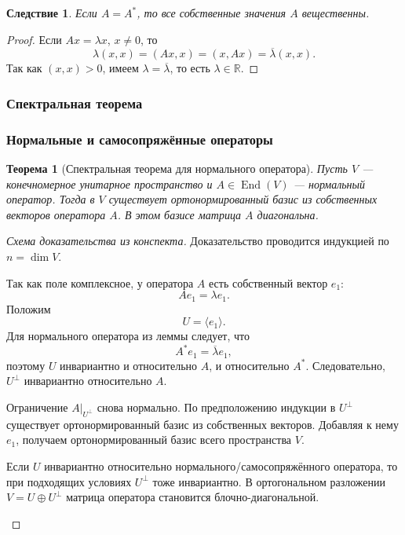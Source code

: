 \documentclass[12pt,a4paper]{article}
\theoremstyle{definition}
\theoremstyle{plain}
\newtheorem{theorem}[definition]{Теорема}
\newtheorem{corollary}[definition]{Следствие}
\theoremstyle{remark}
\newenvironment{knowledgefix}{\begin{clarifybox}}{\end{clarifybox}}
\newcommand{\R}{\mathbb{R}}
\newcommand{\End}{\operatorname{End}}
\begin{document}
\begin{corollary}
Если $A=A^*$, то все собственные значения $A$ вещественны.
\end{corollary}

\begin{proof}
Если $Ax=\lambda x$, $x\ne0$, то
\[
    \lambda(x,x)=(Ax,x)=(x,Ax)=\overline{\lambda}(x,x).
\]
Так как $(x,x)>0$, имеем $\lambda=\overline\lambda$, то есть $\lambda\in\R$.
\end{proof}

\subsubsection{Спектральная теорема}

\subsubsection*{Нормальные и самосопряжённые операторы}

\begin{theorem}[Спектральная теорема для нормального оператора]
Пусть $V$ --- конечномерное унитарное пространство и $A\in\End(V)$ --- нормальный оператор.
Тогда в $V$ существует ортонормированный базис из собственных векторов оператора $A$.
В этом базисе матрица $A$ диагональна.
\end{theorem}

\begin{proof}[Схема доказательства из конспекта]
Доказательство проводится индукцией по $n=\dim V$.

Так как поле комплексное, у оператора $A$ есть собственный вектор $e_1$:
\[
    Ae_1=\lambda e_1.
\]
Положим
\[
    U=\langle e_1\rangle.
\]
Для нормального оператора из леммы следует, что
\[
    A^*e_1=\overline\lambda e_1,
\]
поэтому $U$ инвариантно и относительно $A$, и относительно $A^*$.
Следовательно, $U^\perp$ инвариантно относительно $A$.

Ограничение $A|_{U^\perp}$ снова нормально. По предположению индукции в $U^\perp$ существует ортонормированный базис из собственных векторов.
Добавляя к нему $e_1$, получаем ортонормированный базис всего пространства $V$.
\begin{knowledgefix}
Если \(U\) инвариантно относительно нормального/самосопряжённого оператора, то при подходящих условиях \(U^\perp\) тоже инвариантно. В ортогональном разложении \(V=U\oplus U^\perp\) матрица оператора становится блочно-диагональной.
\end{knowledgefix}
\end{proof}
\end{document}
